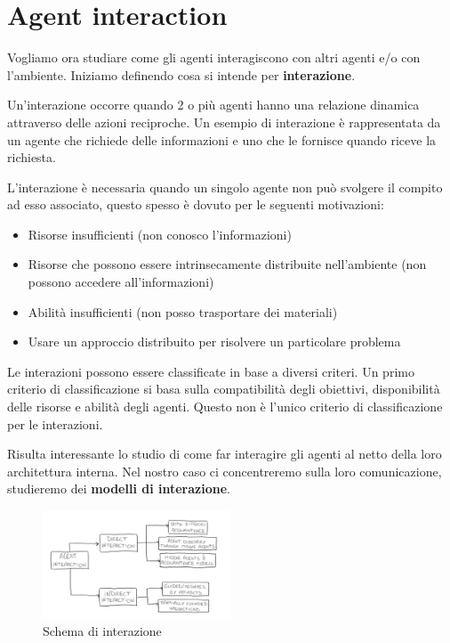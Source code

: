 \section{Agent interaction}
Vogliamo ora studiare come gli agenti interagiscono con altri agenti e/o con
l'ambiente. Iniziamo definendo cosa si intende per \textbf{interazione}.
\begin{definizione}
    Un'interazione occorre quando 2 o più agenti hanno una relazione dinamica
    attraverso delle azioni reciproche. Un esempio di interazione è rappresentata
    da un agente che richiede delle informazioni e uno che le fornisce quando
    riceve la richiesta.
\end{definizione}
L'interazione è necessaria quando un singolo agente non può svolgere il compito
ad esso associato, questo spesso è dovuto per le seguenti motivazioni:
\begin{itemize}
    \item Risorse insufficienti (non conosco l'informazioni)
    \item Risorse che possono essere intrinsecamente distribuite nell'ambiente
          (non possono accedere all'informazioni)
    \item Abilità insufficienti (non posso trasportare dei materiali)
    \item Usare un approccio distribuito per risolvere un particolare problema
\end{itemize}

Le interazioni possono essere classificate in base a diversi criteri. Un primo
criterio di classificazione si basa sulla compatibilità degli obiettivi,
disponibilità delle risorse e abilità degli agenti. Questo non è l'unico criterio
di classificazione per le interazioni.

Risulta interessante lo studio di come far interagire gli agenti al netto della
loro architettura interna. Nel nostro caso ci concentreremo sulla loro
comunicazione, studieremo dei \textbf{modelli di interazione}.


\begin{figure}[!h]
    \centering
    \includegraphics[width=0.50\textwidth]{./img/Agenti/SchemaDiInterazione.PNG}
    \caption{Schema di interazione}
    \label{fig:Schema_di_interazione}
\end{figure}

